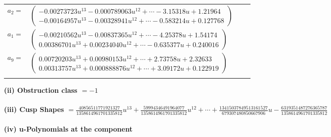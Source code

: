 \documentclass[1p]{elsarticle_modified}
\theoremstyle{definition}
\begin{document}
\begin{tabular}{m{7pt} m{180pt} m{7pt} m{180pt} }
\flushright $a_{2}=$&$\begin{pmatrix}-0.00273723 u^{13}-0.000789063 u^{12}+\cdots-3.15318 u+1.21964\\-0.00164957 u^{13}-0.00328941 u^{12}+\cdots-0.583214 u+0.127768\end{pmatrix}$ \\
\flushright $a_{1}=$&$\begin{pmatrix}-0.00210562 u^{13}-0.00837365 u^{12}+\cdots-4.25378 u+1.54174\\0.00386701 u^{13}+0.00234040 u^{12}+\cdots-0.635377 u+0.240016\end{pmatrix}$ \\
\flushright $a_{9}=$&$\begin{pmatrix}0.00720203 u^{13}+0.00980153 u^{12}+\cdots+2.73758 u+2.32633\\0.00313757 u^{13}+0.000888876 u^{12}+\cdots+3.09172 u+0.122919\end{pmatrix}$\\&\end{tabular}
\flushleft \textbf{(ii) Obstruction class $= -1$}\\~\\
\flushleft \textbf{(iii) Cusp Shapes $= \frac{40856511771921327}{1358614961701335812} u^{13}+\frac{59994346491964077}{1358614961701335812} u^{12}+\cdots+\frac{13415037849513161527}{679307480850667906} u-\frac{6319351487276365787}{1358614961701335812}$}\\~\\
\newpage\renewcommand{\arraystretch}{1}
\flushleft \textbf{(iv) u-Polynomials at the component}\newline \\
\end{document}
